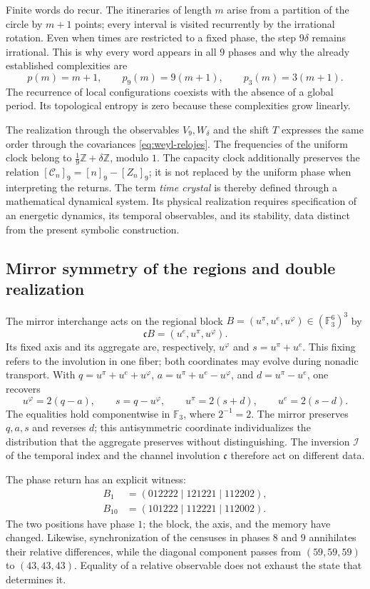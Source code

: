 Finite words do recur. The itineraries of length \(m\) arise from a
partition of the circle by \(m+1\) points; every interval is visited
recurrently by the irrational rotation. Even when times are restricted to a
fixed phase, the step \(9\delta\) remains irrational. This is why every word
appears in all \(9\) phases and why the already established complexities are
\[
 p(m)=m+1,\qquad p_9(m)=9(m+1),\qquad p_3(m)=3(m+1).
\]
The recurrence of local configurations coexists with the absence of a global
period. Its topological entropy is zero because these complexities grow
linearly.

The realization through the observables \(V_9,W_\delta\) and the shift
\(T\) expresses the same order through the covariances
\eqref{eq:weyl-relojes}. The frequencies of the uniform clock belong to
\(\frac19\mathbb Z+\delta\mathbb Z\), modulo \(1\). The capacity clock
additionally preserves the relation
\([\mathcal C_n]_9=[n]_9-[Z_n]_9\); it is not replaced by the uniform phase
when interpreting the returns. The term \emph{time crystal} is thereby
defined through a mathematical dynamical system. Its physical realization
requires specification of an energetic dynamics, its temporal observables,
and its stability, data distinct from the present symbolic construction.

\subsection{Mirror symmetry of the regions and double realization}
\label{mono-ampl:regiones}

The mirror interchange acts on the regional block
\(B=(u^\pi,u^e,u^\varphi)\in(\mathbb F_3^6)^3\) by
\[
 \mathfrak cB=(u^e,u^\pi,u^\varphi).
\]
Its fixed axis and its aggregate are, respectively, \(u^\varphi\) and
\(s=u^\pi+u^e\). This fixing refers to the involution in one fiber;
both coordinates may evolve during nonadic transport.
With \(q=u^\pi+u^e+u^\varphi\),
\(a=u^\pi+u^e-u^\varphi\), and \(d=u^\pi-u^e\), one recovers
\[
 u^\varphi=2(q-a),\qquad s=q-u^\varphi,\qquad
 u^\pi=2(s+d),\qquad u^e=2(s-d).
\]
The equalities hold componentwise in \(\mathbb F_3\), where
\(2^{-1}=2\). The mirror preserves \(q,a,s\) and reverses \(d\); this
antisymmetric coordinate individualizes the distribution that the aggregate
preserves without distinguishing. The inversion \(\mathcal I\) of the
temporal index and the channel involution \(\mathfrak c\) therefore act on
different data.

The phase return has an explicit witness:
\[
 \begin{aligned}
 B_1&=(012222\mid121221\mid112202),\\
 B_{10}&=(101222\mid112221\mid112002).
 \end{aligned}
\]
The two positions have phase \(1\); the block, the axis, and the memory have
changed. Likewise, synchronization of the censuses in phases \(8\) and
\(9\) annihilates their relative differences, while the diagonal component
passes from \((59,59,59)\) to \((43,43,43)\). Equality of a relative
observable does not exhaust the state that determines it.

